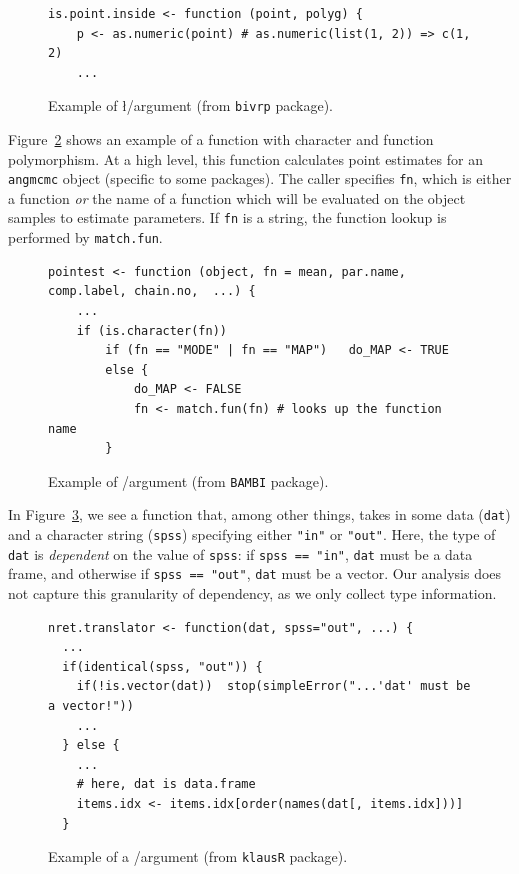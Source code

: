 \documentclass[acmsmall,10pt,review,anonymous]{acmart}\settopmatter{printfolios=true,printccs=false,printacmref=false}
\newcommand{\code}[1]{\lstinline|#1|\xspace}
\begin{document}
\begin{figure}[!hb]{\small\begin{lstlisting}[style=R]
is.point.inside <- function (point, polyg) {
    p <- as.numeric(point) # as.numeric(list(1, 2)) => c(1, 2)
    ...
\end{lstlisting}}\caption{Example of \l/\D argument (from {\tt bivrp} package).}\label{fig:listvec}\end{figure}

Figure~\ref{fig:charclos} shows an example of a function with character and
function polymorphism.  At a high level, this function
calculates point estimates for an {\tt angmcmc} object (specific to some
packages).  The caller specifies {\tt fn}, which is either a function {\it or} the name of a function which will be evaluated on the object samples to estimate parameters.
If {\tt fn} is a string, the function lookup is performed by \code{match.fun}.

\begin{figure}[!hb]{\small\begin{lstlisting}[style=R]
pointest <- function (object, fn = mean, par.name, comp.label, chain.no,  ...) {
    ...
    if (is.character(fn))
        if (fn == "MODE" | fn == "MAP")   do_MAP <- TRUE
        else {
            do_MAP <- FALSE
            fn <- match.fun(fn) # looks up the function name
        }
\end{lstlisting}}\caption{Example of \sC/\sF argument (from {\tt BAMBI} package).}\label{fig:charclos}\end{figure}

In Figure~\ref{fig:dfdbl}, we see a function that, among other things, takes in some data ({\tt dat}) and a
character string ({\tt spss}) specifying either {\tt "in"} or {\tt "out"}.
Here, the type of {\tt dat} is {\it dependent} on the value of {\tt spss}:
if {\tt spss == "in"}, {\tt dat} must be a data frame, and otherwise if {\tt spss == "out"}, {\tt dat} must be a vector.
Our analysis does not capture this granularity of dependency, as we only collect type information.

\begin{figure}[!hb]{\small\begin{lstlisting}[style=R]
nret.translator <- function(dat, spss="out", ...) {
  ...
  if(identical(spss, "out")) {
    if(!is.vector(dat))  stop(simpleError("...'dat' must be a vector!"))
    ...
  } else {
    ...
    # here, dat is data.frame
    items.idx <- items.idx[order(names(dat[, items.idx]))]
  }
\end{lstlisting}}\caption{Example of a \df/\D argument (from {\tt klausR} package).}\label{fig:dfdbl}\end{figure}
\end{document}
